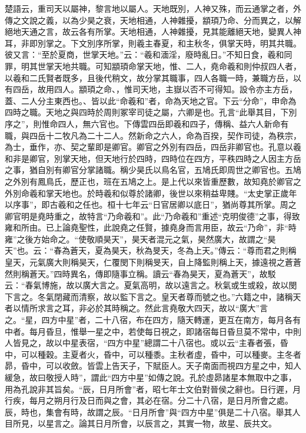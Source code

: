{楚語}云，重司天以屬神，黎言地以屬人。天地既別，人神又殊，而云通掌之者，外傳之文說之義，以為少昊之衰，天地相通，人神雜擾，顓頊乃命、分而異之，以解絕地天通之言，故云各有所掌。天地相通，人神雜擾，見其能離絕天地，變異人神耳，非即別掌之。下文別序所掌，則羲主春夏，和主秋冬，俱掌天時，明其共職。彼又言：“至於夏商，世掌天地。”云：“羲和湎淫，廢時亂日。”不知日食，羲和同罪，明其世掌天地共職。可知顓頊命掌天地，惟、二人，堯命羲和則仲叔四人者，以羲和二氏賢者既多，且後代稍文，故分掌其職事，四人各職一時，兼職方岳，以有四岳，故用四人。顓頊之命、，惟司天地，主嶽以否不可得知。設令亦主方岳，蓋、二人分主東西也。、皆以此“命羲和”者，命為天地之官。下云“分命”，申命為四時之職。天地之與四時於周則冢宰司徒之屬，六卿是也。孔言“此舉其目，下別序之”，則惟命四人，無六官也。下傳雲四岳即羲和四子，傳稱、益六人新命有職，與四岳十二牧凡為二十二人。然新命之六人，命為百揆，契作司徒，為秩宗，為士，垂作，亦、契之輩即是卿官。卿官之外別有四岳，四岳非卿官也。孔意以羲和非是卿官，別掌天地，但天地行於四時，四時位在四方，平秩四時之人因主方岳之事，猶自別有卿官分掌諸職。稱少昊氏以鳥名官，五鳩氏即周世之卿官也。五鳩之外別有鳳鳥氏，歷正也，班在五鳩之上。是上代以來皆重歷數，故知堯於卿官之外別命羲和掌天地也。於時羲和似尊於諸卿，後世以來稍益卑賤。“太史掌正歲年以序事”，即古羲和之任也。桓十七年云“日官居卿以底日”，猶尚尊其所掌。周之卿官明是堯時重之，故特言“乃命羲和”。此“乃命羲和”重述“克明俊德”之事，得致雍和所由。已上論堯聖性，此說堯之任賢，據堯身而言用臣，故云“乃命”，非“時雍”之後方始命之。“使敬順昊天”，昊天者混元之氣，昊然廣大，故謂之“昊天”也。云：“春為蒼天，夏為昊天，秋為旻天，冬為上天。”傳云：“尊而君之則稱皇天，元氣廣大則稱昊天，仁覆閔下則稱旻天，自上降監則稱上天，據遠視之蒼蒼然則稱蒼天。”四時異名，傳即隨事立稱。讀云“春為昊天，夏為蒼天”，故駁云：“春氣博施，故以廣大言之。夏氣高明，故以遠言之。秋氣或生或殺，故以閔下言之。冬氣閉藏而清察，故以監下言之。皇天者尊而號之也。”六籍之中，諸稱天者以情所求言之耳，非必於其時稱之。然此言堯敬大四天，故以“廣大”言之。“星，四方中星”者，二十八宿，布在四方，隨天轉運，更互在南方，每月各有中者。每月昏旦，惟舉一星之中，若使每日視之，即諸宿每日昏旦莫不常中，中則人皆見之，故以中星表宿，“四方中星”總謂二十八宿也。或以云“主春者張，昏中，可以種穀。主夏者火，昏中，可以種黍。主秋者虛，昏中，可以種麥。主冬者昴，昏中，可以收斂。皆雲上告天子，下賦臣人。天子南面而視四方星之中，知人緩急，故曰敬授人時”，謂此“四方中星”如傳之說。孔於虛昴諸星本無取中之事，用為孔說非其旨矣。“辰，日月所會”者，昭七年士文伯對晉侯之辭也。日行遲，月行疾，每月之朔月行及日而與之會，其必在宿。分二十八宿，是日月所會之處。辰，時也，集會有時，故謂之辰。“日月所會”與“四方中星”俱是二十八宿。舉其人目所見，以星言之。論其日月所會，以辰言之，其實一物，故星、辰共文。\CJKunderw